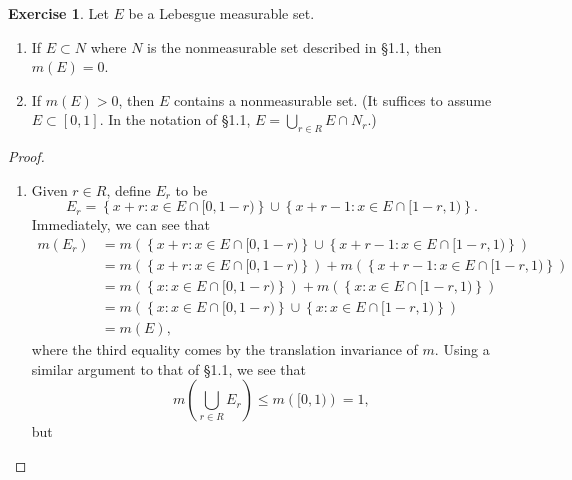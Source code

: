 \documentclass{article}
\theoremstyle{definition}
\newtheorem{ex}{Exercise}
\begin{document}
\begin{ex}
	Let $E$ be a Lebesgue measurable set.
	\begin{enumerate}[label=\textbf{\alph*.}]
		\item If $E \subset N$ where $N$ is the nonmeasurable set described in \S 1.1, then $m(E) = 0$.
		\item If $m(E) > 0$, then $E$ contains a nonmeasurable set.
		      (It suffices to assume $E \subset [0, 1]$. In the notation of \S 1.1, $E = \bigcup_{r \in R}E \cap N_r$.)
	\end{enumerate}
\end{ex}
\begin{proof}\
	\begin{enumerate}[label=\textbf{\alph*.}]
		\item Given $r \in R$, define $E_r$ to be \begin{equation*}
			      E_r = \left\lbrace x + r : x \in E \cap [0, 1 - r) \right\rbrace \cup \left\lbrace x + r - 1 : x \in E \cap [1 - r, 1) \right\rbrace.
		      \end{equation*}
		      Immediately, we can see that \begin{align*}
			      m(E_r) & = m \left( \left\lbrace x + r : x \in E \cap [0, 1 - r) \right\rbrace \cup \left\lbrace x + r - 1 : x \in E \cap [1 - r, 1) \right\rbrace \right)              \\
			             & = m \left( \left\lbrace x + r : x \in E \cap [0, 1 - r) \right\rbrace \right) + m\left( \left\lbrace x + r - 1 : x \in E \cap [1 - r, 1) \right\rbrace \right) \\
			             & = m \left( \left\lbrace x : x \in E \cap [0, 1 - r) \right\rbrace \right) + m\left( \left\lbrace x : x \in E \cap [1 - r, 1) \right\rbrace \right)             \\
			             & = m \left( \left\lbrace x : x \in E \cap [0, 1 - r) \right\rbrace \cup \left\lbrace x : x \in E \cap [1 - r, 1) \right\rbrace \right)                          \\
			             & = m \left( E \right),
		      \end{align*}
		      where the third equality comes by the translation invariance of $m $.
		      Using a similar argument to that of \S 1.1, we see that \begin{equation*}
			      m \left(\bigcup_{r \in R} E_r \right) \leq m\left([0, 1) \right) = 1,
		      \end{equation*}
		      but \begin{equation*}

\end{equation*}
\end{enumerate}
\end{proof}
\end{document}

